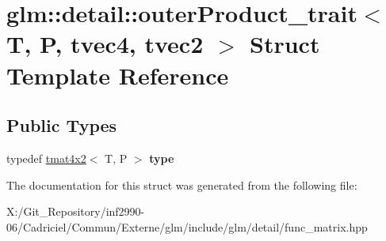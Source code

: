 \hypertarget{structglm_1_1detail_1_1outer_product__trait_3_01_t_00_01_p_00_01tvec4_00_01tvec2_01_4}{\section{glm\-:\-:detail\-:\-:outer\-Product\-\_\-trait$<$ T, P, tvec4, tvec2 $>$ Struct Template Reference}
\label{structglm_1_1detail_1_1outer_product__trait_3_01_t_00_01_p_00_01tvec4_00_01tvec2_01_4}
}
\subsection*{Public Types}
\begin{DoxyCompactItemize}
\item 
\hypertarget{structglm_1_1detail_1_1outer_product__trait_3_01_t_00_01_p_00_01tvec4_00_01tvec2_01_4_a15cc3a28bd3e09c75a19ce0349c76d9a}{typedef \hyperlink{structglm_1_1detail_1_1tmat4x2}{tmat4x2}$<$ T, P $>$ {\bfseries type}}\label{structglm_1_1detail_1_1outer_product__trait_3_01_t_00_01_p_00_01tvec4_00_01tvec2_01_4_a15cc3a28bd3e09c75a19ce0349c76d9a}

\end{DoxyCompactItemize}


The documentation for this struct was generated from the following file\-:\begin{DoxyCompactItemize}
\item 
X\-:/\-Git\-\_\-\-Repository/inf2990-\/06/\-Cadriciel/\-Commun/\-Externe/glm/include/glm/detail/func\-\_\-matrix.\-hpp\end{DoxyCompactItemize}
